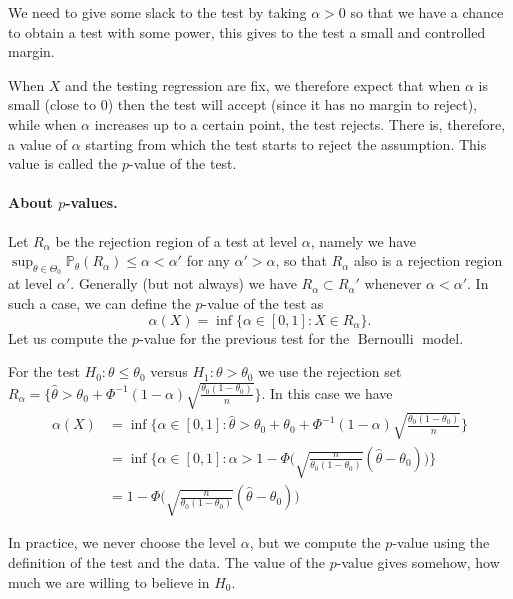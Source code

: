 \documentclass[
	fontsize=11pt, %
	twoside=false, %
	numbers=noenddot, %
]{kaobook}
\DeclareMathOperator{\ber}{Bernoulli}
\renewcommand{\P}{\mathbb P}
\newcommand{\wh}{\widehat}
\begin{document}
We need to give some slack to the test by taking $\alpha > 0$ so that we have a chance to obtain a test with some power, this gives to the test a small and controlled margin.

When $X$ and the testing regression are fix, we therefore expect that when $\alpha$ is small (close to $0$) then the test will accept (since it has no margin to reject), while when $\alpha$ increases up to a certain point, the test rejects.
There is, therefore, a value of $\alpha$ starting from which the test starts to reject the assumption.
This value is called the $p$-value of the test.

\paragraph{About $p$-values.} %

Let $R_\alpha$ be the rejection region of a test at level $\alpha$, namely we have $\sup_{\theta \in \Theta_0} \P_\theta(R_\alpha) \leq \alpha < \alpha'$ for any $\alpha' > \alpha$, so that $R_\alpha$ also is a rejection region at level $\alpha'$.
Generally (but not always) we have $R_\alpha \subset R_\alpha'$ whenever $\alpha < \alpha'$.
In such a case, we can define the $p$-value of the test as
\begin{equation*}
	\alpha(X) = \inf \{ \alpha \in [0, 1] : X \in R_\alpha \}.
\end{equation*}
Let us compute the $p$-value for the previous test for the $\ber$ model.
\begin{example}
	For the test $H_0 : \theta \leq \theta_0$ versus $H_1 : \theta > \theta_0$ we use the rejection set $R_\alpha = \{ \wh \theta > \theta_0 + \Phi^{-1}(1 - \alpha) \sqrt{\frac{\theta_0 (1 - \theta_0)}{n}} \}$.
	In this case we have
	\begin{align*}
		\alpha(X) &= \inf \{ \alpha \in [0, 1] : \wh \theta > \theta_0 + \theta_0 + \Phi^{-1}(1 - \alpha) \sqrt{\frac{\theta_0 (1 - \theta_0)}{n}}  \} \\
		&= \inf \{ \alpha \in [0, 1] : \alpha > 1 - \Phi\Big(  \sqrt{\frac{n}{\theta_0 (1 - \theta_0)}} (\wh \theta - \theta_0) \Big)  \} \\
		&= 1 - \Phi\Big(  \sqrt{\frac{n}{\theta_0 (1 - \theta_0)}} (\wh \theta - \theta_0) \Big)
	\end{align*}
\end{example}


\begin{recipe}
	In practice, we never choose the level $\alpha$, but we compute the $p$-value using the definition of the test and the data. The value of the $p$-value gives somehow, how much we are willing to believe in $H_0$.
\end{recipe}
\end{document}

